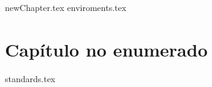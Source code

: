 \documentclass[11pt, oneside]{book}
\begin{document}
	\getcover
	\frontmatter
		\getcoverpage
		\tableofcontents
	\mainmatter
	{newChapter.tex}\cleanalldata
	{enviroments.tex}\cleanalldata
	\chapter*{Capítulo no enumerado}
	\appendix
		{standards.tex}\cleanalldata
\end{document}
